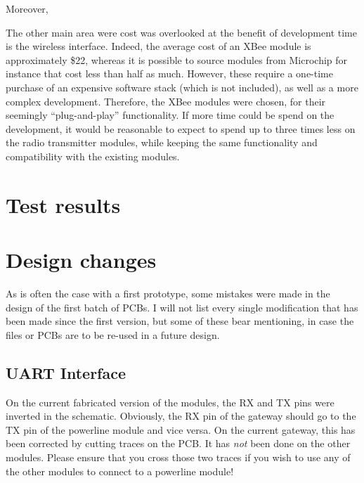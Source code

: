 Moreover,

The other main area were cost was overlooked at the benefit of development time
is the wireless interface. Indeed, the average cost of an XBee module is
approximately \$22, whereas it is possible to source modules from Microchip for
instance that cost less than half as much. However, these require a one-time
purchase of an expensive software stack (which is not included), as well as a
more complex development. Therefore, the XBee modules were chosen, for their
seemingly ``plug-and-play'' functionality. If more time could be spend on the
development, it would be reasonable to expect to spend up to three times less on
the radio transmitter modules, while keeping the same functionality and
compatibility with the existing modules.


\section{Test results}




\pagebreak
\appendix

\section{Design changes}
\label{sec:design-changes}

As is often the case with a first prototype, some mistakes were made in the
design of the first batch of PCBs. I will not list every single modification
that has been made since the first version, but some of these bear mentioning,
in case the files or PCBs are to be re-used in a future design.

\subsection{UART Interface}
On the current fabricated version of the modules, the RX and TX pins were
inverted in the schematic. Obviously, the RX pin of the gateway should go to the
TX pin of the powerline module and vice versa. On the current gateway, this has
been corrected by cutting traces on the PCB. It has \emph{not} been done on the
other modules. Please ensure that you cross those two traces if you wish to use
any of the other modules to connect to a powerline module!

